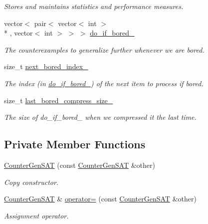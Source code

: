 \begin{DoxyCompactItemize}
\begin{DoxyCompactList}\small\item\em Stores and maintains statistics and performance measures. \end{DoxyCompactList}\item 
vector$<$ pair$<$ vector$<$ int $>$\\*
, vector$<$ int $>$ $>$ $>$ \hyperlink{classCounterGenSAT_ae4f7bf80b40a44580fde913f300ac4c1}{do\-\_\-if\-\_\-bored\-\_\-}
\begin{DoxyCompactList}\small\item\em The counterexamples to generalize further whenever we are bored. \end{DoxyCompactList}\item 
size\-\_\-t \hyperlink{classCounterGenSAT_a404764a6142a0cd55e1b3e40d2e0483b}{next\-\_\-bored\-\_\-index\-\_\-}
\begin{DoxyCompactList}\small\item\em The index (in \hyperlink{classCounterGenSAT_ae4f7bf80b40a44580fde913f300ac4c1}{do\-\_\-if\-\_\-bored\-\_\-}) of the next item to process if bored. \end{DoxyCompactList}\item 
size\-\_\-t \hyperlink{classCounterGenSAT_ae3befc2cd3c74b65e055f7d29dcc9c05}{last\-\_\-bored\-\_\-compress\-\_\-size\-\_\-}
\begin{DoxyCompactList}\small\item\em The size of do\-\_\-if\-\_\-bored\-\_\- when we compressed it the last time. \end{DoxyCompactList}\end{DoxyCompactItemize}
\subsection*{Private Member Functions}
\begin{DoxyCompactItemize}
\item 
\hyperlink{classCounterGenSAT_a7a2d9c241f14798e2073b2ff298acd6f}{Counter\-Gen\-S\-A\-T} (const \hyperlink{classCounterGenSAT}{Counter\-Gen\-S\-A\-T} \&other)
\begin{DoxyCompactList}\small\item\em Copy constructor. \end{DoxyCompactList}\item 
\hyperlink{classCounterGenSAT}{Counter\-Gen\-S\-A\-T} \& \hyperlink{classCounterGenSAT_aa7bcdd4ed8d19447d39d83231123db5d}{operator=} (const \hyperlink{classCounterGenSAT}{Counter\-Gen\-S\-A\-T} \&other)
\begin{DoxyCompactList}\small\item\em Assignment operator. \end{DoxyCompactList}\end{DoxyCompactItemize}


